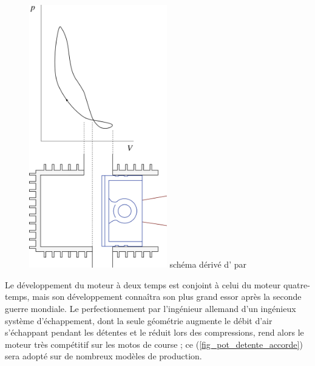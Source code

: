 	\begin{figure}
		\begin{center}
			\includegraphics[width=6cm]{images/pv_deux_temps.png}
			{schéma dérivé d’ \ccbysa par }
			\label{fig_pv_deux_temps}
		\end{center}
	\end{figure}
	
	Le développement du moteur à deux temps est conjoint à celui du moteur quatre-temps, mais son développement connaîtra son plus grand essor après la seconde guerre mondiale. Le perfectionnement par l’ingénieur allemand  d’un ingénieux système d’échappement, dont la seule géométrie augmente le débit d’air s’échappant pendant les détentes et le réduit lors des compressions, rend alors le moteur très compétitif sur les motos de course ; ce  (\cref{fig_pot_detente_accorde}) sera adopté sur de nombreux modèles de production. 	
	
